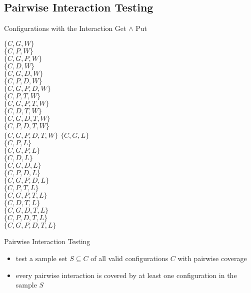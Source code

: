 \subsection{Pairwise Interaction Testing}
\begin{frame}{\myframetitle}
	\begin{mycolumns}
		\begin{example}{Configurations with the Interaction Get $\wedge$ Put}
			\footnotesize
			\begin{mycolumns}[animation=none]
				$\{C,G,W\}$\\
				$\{C,P,W\}$\\
				\emph{$\{C,G,P,W\}$}\\
				$\{C,D,W\}$\\
				$\{C,G,D,W\}$\\
				$\{C,P,D,W\}$\\
				\emph{$\{C,G,P,D,W\}$}\\
				$\{C,P,T,W\}$\\
				\emph{$\{C,G,P,T,W\}$}\\
				$\{C,D,T,W\}$\\
				$\{C,G,D,T,W\}$\\
				$\{C,P,D,T,W\}$\\
				\emph{$\{C,G,P,D,T,W\}$}
			\mynextcolumn
				$\{C,G,L\}$\\
				$\{C,P,L\}$\\
				\emph{$\{C,G,P,L\}$}\\
				$\{C,D,L\}$\\
				$\{C,G,D,L\}$\\
				$\{C,P,D,L\}$\\
				\emph{$\{C,G,P,D,L\}$}\\
				$\{C,P,T,L\}$\\
				\emph{$\{C,G,P,T,L\}$}\\
				$\{C,D,T,L\}$\\
				$\{C,G,D,T,L\}$\\
				$\{C,P,D,T,L\}$\\
				\emph{$\{C,G,P,D,T,L\}$}
			\end{mycolumns}
		\end{example}
		\pause
		\begin{definition}{Pairwise Interaction Testing}
			\begin{itemize}
				\setlength\itemsep{.5em}
				\item test a sample set $S \subseteq C$ of all valid configurations $C$ with pairwise coverage
				\item every pairwise interaction is covered by at least one configuration in the sample $S$

\end{itemize}
\end{definition}
\end{mycolumns}
\end{frame}
